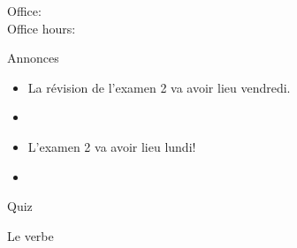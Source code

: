 \documentclass{beamer}
\subtitle[\lexi{Mettre} et adjectifs démonstratifs]{Le verbe \lexi{mettre} et les adjectifs démonstratifs}
\begin{document}
  \begin{frame}
    \titlepage
    \tiny{Office: \\
          Office hours: }
  \end{frame}

  \begin{frame}{Annonces}
    \begin{itemize}
      \item La révision de l'examen 2 va avoir lieu vendredi.
      \item[] 
      \item L'examen 2 va avoir lieu lundi!
      \item[] 
    \end{itemize}
  \end{frame}

  \begin{frame}{}
    \begin{center}
      \Large Quiz
    \end{center}
  \end{frame}

  \begin{frame}{Le verbe}
    \begin{center}
      
    \end{center}
  \end{frame}
\end{document}
